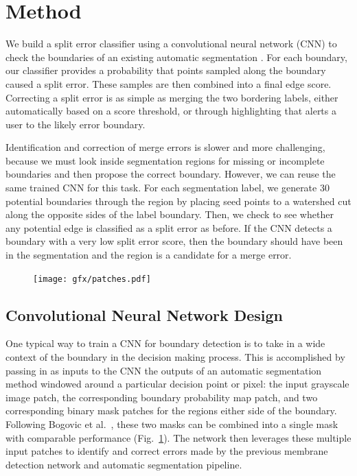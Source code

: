 \section{Method}
We build a split error classifier using a convolutional neural network (CNN) to check the boundaries of an existing automatic segmentation \cite{jain2010,kaynig2015large,Liu2014,NunezIglesias2013Machine,GALA2014,amelio_segmentation}. For each boundary, our classifier provides a probability that points sampled along the boundary caused a split error. These samples are then combined into a final edge score. Correcting a split error is as simple as merging the two bordering labels, either automatically based on a score threshold, or through highlighting that alerts a user to the likely error boundary.

Identification and correction of merge errors is slower and more challenging, because we must look inside segmentation regions for missing or incomplete boundaries and then propose the correct boundary. However, we can reuse the same trained CNN for this task. For each segmentation label, we generate 30 potential boundaries through the region by placing seed points to a watershed cut along the opposite sides of the label boundary. Then, we check to see whether any potential edge is classified as a split error as before. If the CNN detects a boundary with a very low split error score, then the boundary should have been in the segmentation and the region is a candidate for a merge error.

\begin{figure}[t]
\centering
\texttt{[image: gfx/patches.pdf]}
\caption{}
\label{fig:patches}
\end{figure}


\subsection{Convolutional Neural Network Design}
One typical way to train a CNN for boundary detection is to take in a wide context of the boundary in the decision making process. This is accomplished by passing in as inputs to the CNN the outputs of an automatic segmentation method windowed around a particular decision point or pixel: the input grayscale image patch, the corresponding boundary probability map patch, and two corresponding binary mask patches for the regions either side of the boundary. Following Bogovic et al.~\cite{BogovicHJ13}, these two masks can be combined into a single mask with comparable performance (Fig.~\ref{fig:patches}). The network then leverages these multiple input patches to identify and correct errors made by the previous membrane detection network and automatic segmentation pipeline.

